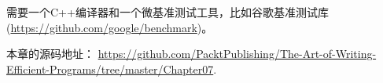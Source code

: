 需要一个C++编译器和一个微基准测试工具，比如谷歌基准测试库(\url{https://github.com/google/benchmark})。

本章的源码地址： \url{https://github.com/PacktPublishing/The-Art-of-Writing-Efficient-Programs/tree/master/Chapter07}.